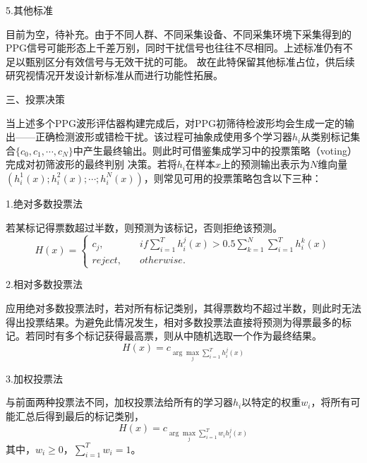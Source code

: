 5.其他标准

目前为空，待补充。由于不同人群、不同采集设备、不同采集环境下采集得到的PPG信号可能形态上千差万别，同时干扰信号也往往不尽相同。上述标准仍有不足以甄别区分有效信号与无效干扰的可能。
故在此特保留其他标准占位，供后续研究视情况开发设计新标准从而进行功能性拓展。

三、投票决策

当上述多个PPG波形评估器构建完成后，对PPG初筛待检波形均会生成一定的输出——正确检测波形或错检干扰。该过程可抽象成使用多个学习器$h_i$从类别标记集合$\{c_0,c_1,\cdots,c_N\}$中产生最终输出。则此时可借鉴集成学习中的投票策略（voting）完成对初筛波形的最终判别
决策\cite{Zhou2016}。若将$h_i$在样本$x$上的预测输出表示为$N$维向量$(h_i^1(x);h_i^2(x);\cdots;h_i^N(x))$，则常见可用的投票策略包含以下三种\cite{Kittler1998,Zhou2016}：

1.绝对多数投票法

若某标记得票数超过半数，则预测为该标记，否则拒绝该预测。
\begin{equation}
    \label{equ:mvoting}
    H(x)=
    \left \{
    \begin{aligned}
        c_j,&\quad if \sum_{i=1}^T{h_i^j(x)}>0.5\sum_{k=1}^N{\sum_{i=1}^T}{h_i^k(x)}\\
        reject,&\quad otherwise.
    \end{aligned}
    \right.
\end{equation}

2.相对多数投票法

应用绝对多数投票法时，若对所有标记类别，其得票数均不超过半数，则此时无法得出投票结果。为避免此情况发生，相对多数投票法直接将预测为得票最多的标记。若同时有多个标记获得最高票，则从中随机选取一个作为最终结果。
\begin{equation}
    \label{equ:pvoting}
    H(x)=c_{\arg \max\limits_{j} \sum_{i=1}^T{h_i^j(x)}}
\end{equation}

3.加权投票法

与前面两种投票法不同，加权投票法给所有的学习器$h_i$以特定的权重$w_i$，将所有可能汇总后得到最后的标记类别，
\begin{equation}
    \label{equ:wvoting}
    H(x)=c_{\arg \max\limits_{j} \sum_{i=1}^T{w_ih_i^j(x)}}
\end{equation}
其中，$w_i\ge0$，$\sum_{i=1}^T{w_i=1}$。

